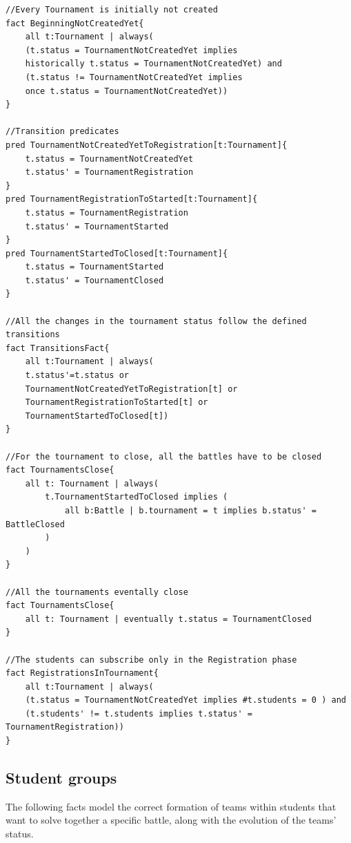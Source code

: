 \begin{verbatim}
//Every Tournament is initially not created
fact BeginningNotCreatedYet{
    all t:Tournament | always(
    (t.status = TournamentNotCreatedYet implies
    historically t.status = TournamentNotCreatedYet) and
    (t.status != TournamentNotCreatedYet implies
    once t.status = TournamentNotCreatedYet))
}

//Transition predicates
pred TournamentNotCreatedYetToRegistration[t:Tournament]{
    t.status = TournamentNotCreatedYet
    t.status' = TournamentRegistration
}
pred TournamentRegistrationToStarted[t:Tournament]{
    t.status = TournamentRegistration
    t.status' = TournamentStarted
}
pred TournamentStartedToClosed[t:Tournament]{
    t.status = TournamentStarted
    t.status' = TournamentClosed
}

//All the changes in the tournament status follow the defined transitions
fact TransitionsFact{
    all t:Tournament | always( 
    t.status'=t.status or
    TournamentNotCreatedYetToRegistration[t] or
    TournamentRegistrationToStarted[t] or
    TournamentStartedToClosed[t])
}

//For the tournament to close, all the battles have to be closed
fact TournamentsClose{
    all t: Tournament | always(
        t.TournamentStartedToClosed implies (
            all b:Battle | b.tournament = t implies b.status' = BattleClosed
        )
    )
}

//All the tournaments eventally close
fact TournamentsClose{
    all t: Tournament | eventually t.status = TournamentClosed
}

//The students can subscribe only in the Registration phase
fact RegistrationsInTournament{
    all t:Tournament | always(
    (t.status = TournamentNotCreatedYet implies #t.students = 0 ) and
    (t.students' != t.students implies t.status' = TournamentRegistration))
}
\end{verbatim}

\subsection{Student groups}
The following facts model the correct formation of teams within students that want to solve together a specific battle, along with the evolution of the teams' status.


